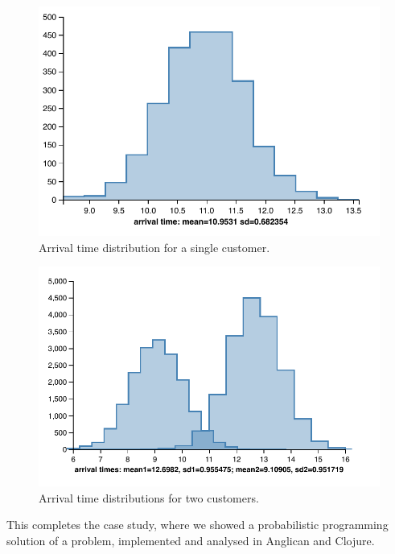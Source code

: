 \documentclass[preprint]{sigplanconf}
\begin{document}
\begin{figure}
    \centering
    \includegraphics[trim={12pt 0 0 0},scale=0.6]{same-customer-time.pdf}
    \caption{Arrival time distribution for a single customer.}
    \label{fig:dist-same}
\end{figure}

\begin{figure}
    \centering
    \includegraphics[trim={12pt 0 0 0},scale=0.6]{different-customers-times.pdf}
    \caption{Arrival time distributions for two customers.}
    \label{fig:dist-diff}
\end{figure}

\iftoggle{full}{%

}{}%

This completes the case study, where we showed a probabilistic
programming solution of a problem, implemented and analysed in
Anglican and Clojure\iftoggle{full}{, using two different
inference algorithms}{}.
\end{document}
